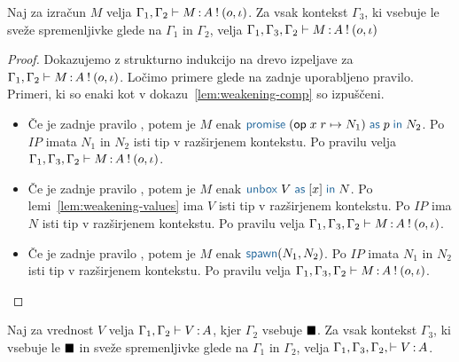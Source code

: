 \begin{lema}\label{lem:weakening-comp-2}
	Naj za izračun $M$ velja $\Gamma_1, \Gamma_2 \vdash M \mathinner{:} A \mathbin{!} (o, \iota)$. Za vsak kontekst $\Gamma_3$, ki vsebuje le sveže spremenljivke glede na $\Gamma_1$ in $\Gamma_2$, velja $\Gamma_1, \Gamma_3, \Gamma_2 \vdash M \mathinner{:} A \mathbin{!} (o, \iota)$
\end{lema}

\begin{proof}
	Dokazujemo z strukturno indukcijo na drevo izpeljave za $\Gamma_1, \Gamma_2 \vdash M \mathinner{:} A \mathbin{!} (o, \iota)$.
	Ločimo primere glede na zadnje uporabljeno pravilo.
	Primeri, ki so enaki kot v dokazu~\ref{lem:weakening-comp} so izpuščeni.
	
	\begin{itemize}
		\item Če je zadnje pravilo , potem je $M$ enak $\tmwithrec{op}{x}{r}{N_1}{p}{N_2}$.
		Po $IP$ imata $N_1$ in $N_2$ isti tip v razširjenem kontekstu.
		Po pravilu  velja $\Gamma_1, \Gamma_3, \Gamma_2 \vdash M \mathinner{:} A \mathbin{!} (o, \iota)$.
		
		\item Če je zadnje pravilo , potem je $M$ enak $\tmunbox{V}{x}{N}$.
		Po lemi~\ref{lem:weakening-values} ima $V$ isti tip v razširjenem kontekstu.
		Po $IP$ ima $N$ isti tip v razširjenem kontekstu.
		Po pravilu  velja $\Gamma_1, \Gamma_3, \Gamma_2 \vdash M \mathinner{:} A \mathbin{!} (o, \iota)$.
		
		\item Če je zadnje pravilo , potem je $M$ enak $\tmspawn{N_1}{N_2}$.
		Po $IP$ imata $N_1$ in $N_2$ isti tip v razširjenem kontekstu.
		Po pravilu  velja $\Gamma_1, \Gamma_3, \Gamma_2 \vdash M \mathinner{:} A \mathbin{!} (o, \iota)$.
		
	\end{itemize}
\end{proof}

\begin{lema}\label{lem:weakening-values-bb}
	Naj za vrednost $V$ velja $\Gamma_1, \Gamma_2 \vdash V \mathinner{:} A$, kjer $\Gamma_2$ vsebuje $\blacksquare$.
	Za vsak kontekst $\Gamma_3$, ki vsebuje le $\blacksquare$ in sveže spremenljivke glede na $\Gamma_1$ in $\Gamma_2$, velja $\Gamma_1, \Gamma_3, \Gamma_2, \vdash V \mathinner{:} A$.
\end{lema}

